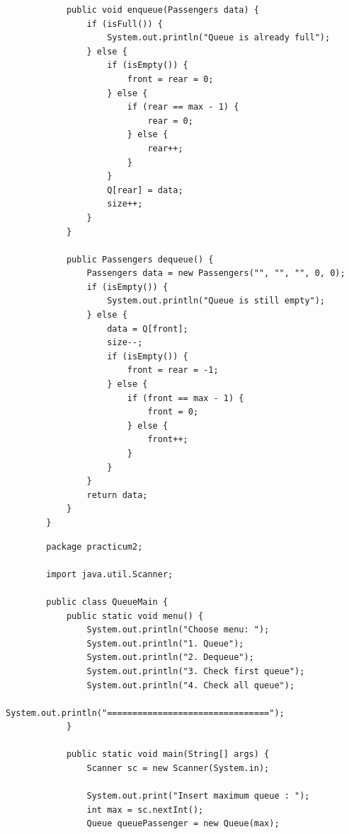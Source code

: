 \documentclass[12pt,titlepage]{article}
\begin{document}
\begin{enumerate}
\begin{verbatim}
            public void enqueue(Passengers data) {
                if (isFull()) {
                    System.out.println("Queue is already full");
                } else {
                    if (isEmpty()) {
                        front = rear = 0;
                    } else {
                        if (rear == max - 1) {
                            rear = 0;
                        } else {
                            rear++;
                        }
                    }
                    Q[rear] = data;
                    size++;
                }
            }

            public Passengers dequeue() {
                Passengers data = new Passengers("", "", "", 0, 0);
                if (isEmpty()) {
                    System.out.println("Queue is still empty");
                } else {
                    data = Q[front];
                    size--;
                    if (isEmpty()) {
                        front = rear = -1;
                    } else {
                        if (front == max - 1) {
                            front = 0;
                        } else {
                            front++;
                        }
                    }
                }
                return data;
            }
        }
    \end{verbatim}

    \begin{verbatim}
        package practicum2;

        import java.util.Scanner;

        public class QueueMain {
            public static void menu() {
                System.out.println("Choose menu: ");
                System.out.println("1. Queue");
                System.out.println("2. Dequeue");
                System.out.println("3. Check first queue");
                System.out.println("4. Check all queue");
                System.out.println("================================");
            }

            public static void main(String[] args) {
                Scanner sc = new Scanner(System.in);

                System.out.print("Insert maximum queue : ");
                int max = sc.nextInt();
                Queue queuePassenger = new Queue(max);


\end{verbatim}
\end{enumerate}
\end{document}
